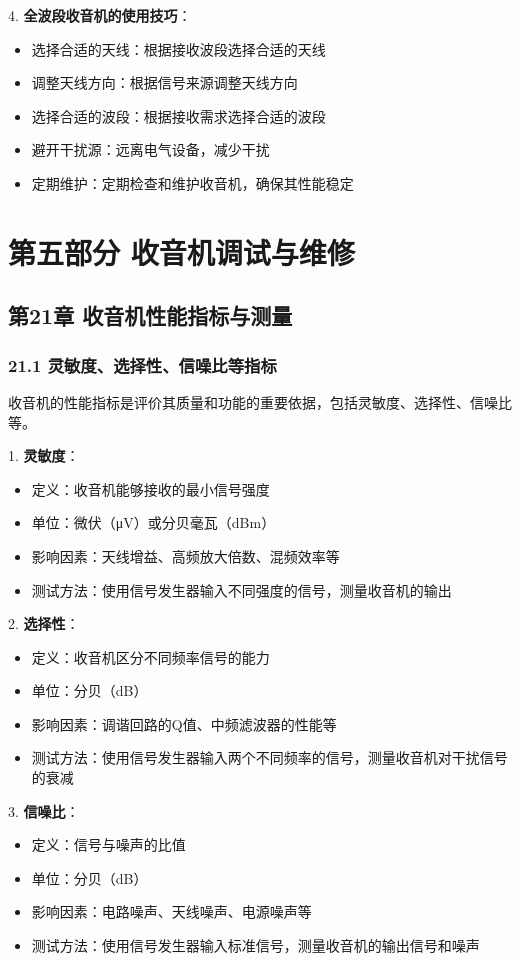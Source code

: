\documentclass[12pt,UTF8]{ctexbook}
\begin{document}
4. \textbf{全波段收音机的使用技巧}：
   \begin{itemize}[leftmargin=3.5em]
   \item 选择合适的天线：根据接收波段选择合适的天线
   \item 调整天线方向：根据信号来源调整天线方向
   \item 选择合适的波段：根据接收需求选择合适的波段
   \item 避开干扰源：远离电气设备，减少干扰
   \item 定期维护：定期检查和维护收音机，确保其性能稳定
   \end{itemize}

\part*{第五部分 收音机调试与维修}

\chapter*{第21章 收音机性能指标与测量}
\section*{21.1 灵敏度、选择性、信噪比等指标}

收音机的性能指标是评价其质量和功能的重要依据，包括灵敏度、选择性、信噪比等。

1. \textbf{灵敏度}：
   \begin{itemize}[leftmargin=3.5em]
   \item 定义：收音机能够接收的最小信号强度
   \item 单位：微伏（μV）或分贝毫瓦（dBm）
   \item 影响因素：天线增益、高频放大倍数、混频效率等
   \item 测试方法：使用信号发生器输入不同强度的信号，测量收音机的输出
   \end{itemize}

2. \textbf{选择性}：
   \begin{itemize}[leftmargin=3.5em]
   \item 定义：收音机区分不同频率信号的能力
   \item 单位：分贝（dB）
   \item 影响因素：调谐回路的Q值、中频滤波器的性能等
   \item 测试方法：使用信号发生器输入两个不同频率的信号，测量收音机对干扰信号的衰减
   \end{itemize}

3. \textbf{信噪比}：
   \begin{itemize}[leftmargin=3.5em]
   \item 定义：信号与噪声的比值
   \item 单位：分贝（dB）
   \item 影响因素：电路噪声、天线噪声、电源噪声等
   \item 测试方法：使用信号发生器输入标准信号，测量收音机的输出信号和噪声
   \end{itemize}
\end{document}
